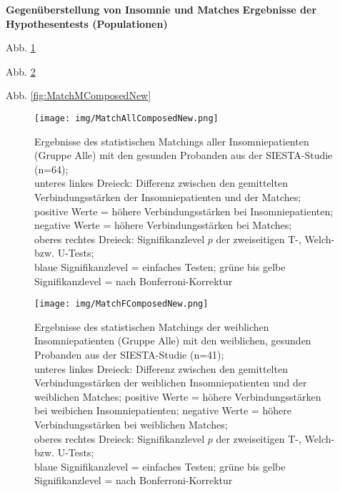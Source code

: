 \textbf{Gegenüberstellung von Insomnie und Matches}
\textbf{Ergebnisse der Hypothesentests (Populationen)}

Abb. \ref{fig:MatchAllComposedNew}

Abb. \ref{fig:MatchFComposedNew}

Abb. \ref{fig:MatchMComposedNew}




\begin{figure}[H]
	\centering
	\texttt{[image: img/MatchAllComposedNew.png]}
	\caption[Ergebnisse des statistischen Matchings der Insomniepatienten mit den gesunden Probanden]{Ergebnisse des statistischen Matchings aller Insomniepatienten (Gruppe Alle) mit den gesunden Probanden aus der SIESTA-Studie (n=64);\\unteres linkes Dreieck: Differenz zwischen den gemittelten Verbindungsstärken der Insomniepatienten und der Matches; positive Werte = höhere Verbindungsstärken bei Insomniepatienten; negative Werte = höhere Verbindungsstärken bei Matches;\\oberes rechtes Dreieck: Signifikanzlevel $p$ der zweiseitigen T-, Welch- bzw. U-Tests;\\blaue Signifikanzlevel = einfaches Testen; grüne bis gelbe Signifikanzlevel = nach Bonferroni-Korrektur}
	\label{fig:MatchAllComposedNew}
\end{figure}




\begin{figure}[H]
	\centering
	\texttt{[image: img/MatchFComposedNew.png]}
	\caption[Ergebnisse des statistischen Matchings der Insomniepatienten mit den gesunden Probanden]{Ergebnisse des statistischen Matchings der weiblichen Insomniepatienten (Gruppe Alle) mit den weiblichen, gesunden Probanden aus der SIESTA-Studie (n=41);\\unteres linkes Dreieck: Differenz zwischen den gemittelten Verbindungsstärken der weiblichen Insomniepatienten und der weiblichen Matches; positive Werte = höhere Verbindungsstärken bei weibichen Insomniepatienten; negative Werte = höhere Verbindungsstärken bei weiblichen Matches;\\oberes rechtes Dreieck: Signifikanzlevel $p$ der zweiseitigen T-, Welch- bzw. U-Tests;\\blaue Signifikanzlevel = einfaches Testen; grüne bis gelbe Signifikanzlevel = nach Bonferroni-Korrektur}
	\label{fig:MatchFComposedNew}
\end{figure}




